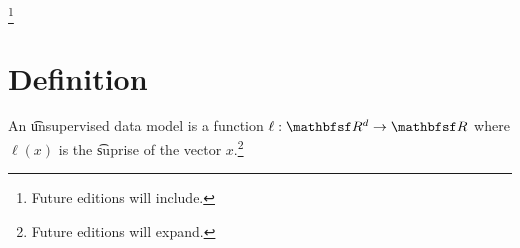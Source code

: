 
\footnote{Future editions will include.}

\section{Definition}

An \t{unsupervised data model} is a function $\ell: \R^d \to \R$ where $\ell(x)$ is the \t{suprise} of the vector $x$.\footnote{Future editions will expand.}


\blankpage
